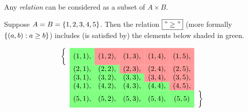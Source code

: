 \documentclass[10pt]{beamer}
\begin{document}
\begin{frame}


\begin{myyellowbox}[title=Perspective on Relations]
Any \textit{relation} can be considered as a subset of $A \times B$.
\end{myyellowbox}

\begin{mygreenbox}[title=Example]
Suppose $A=B=\{ {1,2,3,4,5} \}$.  Then the relation $\boxed{"\geq"}$ (more formally $\{ {(a,b): a \geq b} \}$) includes (is satisfied by) the elements below shaded in green.
\vfill 

   \[
    \begin{array}{ccccccc}
        \bigg\{ &   \cellcolor{green!50} (1,1), & \cellcolor{red!40} (1,2), & \cellcolor{red!40} (1,3), & \cellcolor{red!40} (1,4), & \cellcolor{red!40} (1,5), &\\
         & \cellcolor{green!50} (2,1), & \cellcolor{green!50} (2,2), & \cellcolor{red!40} (2,3), & \cellcolor{red!40} (2,4), & \cellcolor{red!40} (2,5), &\\
        & \cellcolor{green!50} (3,1), & \cellcolor{green!50} (3,2), & \cellcolor{green!50} (3,3), & \cellcolor{red!40} (3,4), & \cellcolor{red!40} (3,5), &\\
        & \cellcolor{green!50} (4,1), & \cellcolor{green!50} (4,2), & \cellcolor{green!50} (4,3), & \cellcolor{green!50} (4,4), & \cellcolor{red!40} (4,5), & \\
        & \cellcolor{green!50} (5,1), & \cellcolor{green!50} (5,2), & \cellcolor{green!50} (5,3), & \cellcolor{green!50} (5,4), & \cellcolor{green!50} (5,5) & \bigg\} \\
    \end{array}
    \]
\end{mygreenbox}
\end{frame}
\end{document}
